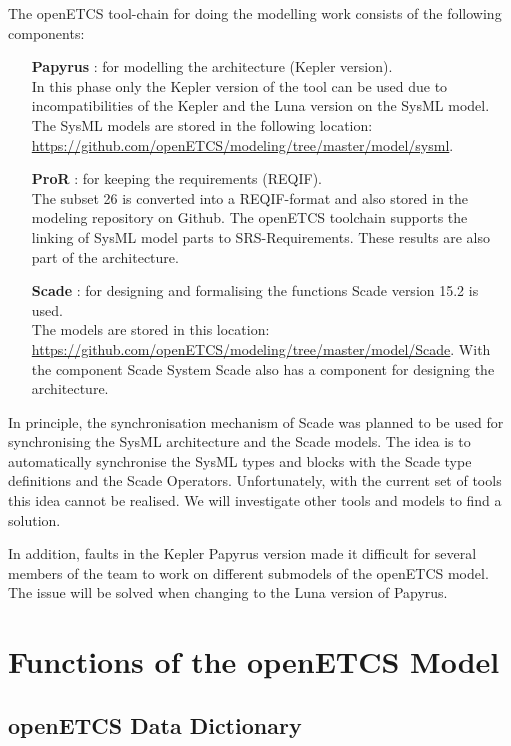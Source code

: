 \documentclass{template/openetcs_article}
\begin{document}
The openETCS tool-chain for doing the modelling work consists of the following components:
\begin{itemize}
	\item [\textbf{Papyrus}]: for modelling the architecture (Kepler version).\\
	In this phase only the Kepler version of the tool can be used due to incompatibilities of the Kepler and the Luna version on the SysML model. The SysML models are stored in the following location: \url{https://github.com/openETCS/modeling/tree/master/model/sysml}.
	\item [\textbf{ProR}]: for keeping the requirements (REQIF).\\
	The subset 26 is converted into a REQIF-format and also stored in the modeling repository on Github. The openETCS toolchain supports the linking of SysML model parts to SRS-Requirements. These results are also part of the architecture.
	\item [\textbf{Scade}]: for designing and formalising the functions Scade version 15.2 is used.\\
	The models are stored in this location: \url{https://github.com/openETCS/modeling/tree/master/model/Scade}.
	With the component Scade System Scade also has a component for designing the architecture.
\end{itemize}

In principle, the synchronisation mechanism of Scade was planned to be used for synchronising the SysML architecture and the Scade models. The idea is to automatically synchronise the SysML types and blocks with the Scade type definitions and the Scade Operators. Unfortunately, with the current set of tools this idea cannot be realised. We will investigate other tools and models to find a solution. 

In addition, faults in the Kepler Papyrus version made it difficult for several members of the team to work on different submodels of the openETCS model. The issue will be solved when changing to the Luna version of Papyrus.



\section{Functions of the openETCS Model}

\subsection{openETCS Data Dictionary}
\end{document}
